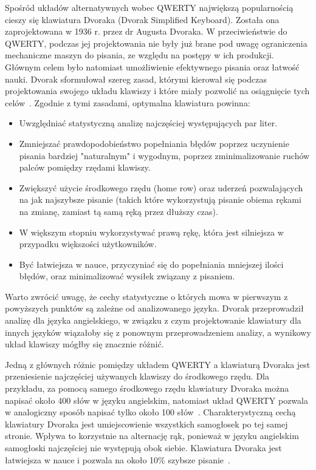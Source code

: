 \documentclass[brudnopis]{xmgr}
\begin{document}
Spośród układów alternatywnych wobec QWERTY największą popularnością cieszy się klawiatura Dvoraka (Dvorak Simplified Keyboard). Została ona zaprojektowana w 1936 r. przez dr Augusta Dvoraka. W przeciwieństwie do QWERTY, podczas jej projektowania nie były już brane pod uwagę ograniczenia mechaniczne maszyn do pisania, ze względu na postępy w ich produkcji. Głównym celem było natomiast umożliwienie efektywnego pisania oraz łatwość nauki. Dvorak sformułował szereg zasad, którymi kierował się podczas projektowania swojego układu klawiszy i które miały pozwolić na osiągnięcie tych celów~\cite{cassingham1986dvorak}. Zgodnie z tymi zasadami, optymalna klawiatura powinna:
\begin{itemize}
\item Uwzględniać statystyczną analizę najczęściej występujących par liter.
\item Zmniejszać prawdopodobieństwo popełniania błędów poprzez uczynienie pisania bardziej "naturalnym" i wygodnym, poprzez zminimalizowanie ruchów palców pomiędzy rzędami klawiszy.
\item Zwiększyć użycie środkowego rzędu (home row) oraz uderzeń pozwalających na jak najszybsze pisanie (takich które wykorzystują pisanie obiema rękami na zmianę, zamiast tą samą ręką przez dłuższy czas).
\item W większym stopniu wykorzystywać prawą rękę, która jest silniejsza w przypadku większości użytkowników.
\item Być łatwiejsza w nauce, przyczyniać się do popełniania mniejszej ilości błędów, oraz minimalizować wysiłek związany z pisaniem.
\end{itemize}
Warto zwrócić uwagę, że cechy statystyczne o których mowa w pierwszym z powyższych punktów są zależne od analizowanego języka. Dvorak przeprowadził analizę dla języka angielskiego, w związku z czym projektowanie klawiatury dla innych języków wiązałoby się z ponownym przeprowadzeniem analizy, a wynikowy układ klawiszy mógłby się znacznie różnić.

Jedną z głównych różnic pomiędzy układem QWERTY a klawiaturą Dvoraka jest przeniesienie najczęściej używanych klawiszy do środkowego rzędu. Dla przykładu, za pomocą samego środkowego rzędu klawiatury Dvoraka można napisać około 400 słów w języku angielskim, natomiast układ QWERTY pozwala w analogiczny sposób napisać tylko około 100 słów~\cite{Call:2005:CME}. Charakterystyczną cechą klawiatury Dvoraka jest umiejscowienie wszystkich samogłosek po tej samej stronie. Wpływa to korzystnie na alternację rąk, ponieważ w języku angielskim samogłoski najczęściej nie występują obok siebie. Klawiatura Dvoraka jest łatwiejsza w nauce i pozwala na około 10\% szybsze pisanie~\cite{Norman:1988:DOET}.
\end{document}
